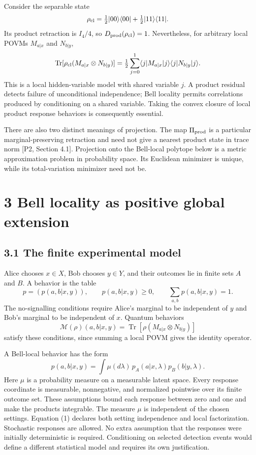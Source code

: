 \documentclass[
]{article}
\begin{document}
Consider the separable state
\[
\rho_{\rm cl}=\tfrac12|00\rangle\langle00|
                    +\tfrac12|11\rangle\langle11|.
\]
Its product retraction is \(I_4/4\), so \(D_{\rm prod}(\rho_{\rm cl})=1\). Nevertheless, for arbitrary local POVMs \(M_{a|x}\) and \(N_{b|y}\),
\[
\operatorname{Tr}[\rho_{\rm cl}(M_{a|x}\otimes N_{b|y})]
=\tfrac12\sum_{j=0}^1
\langle j|M_{a|x}|j\rangle\langle j|N_{b|y}|j\rangle.
\]
This is a local hidden-variable model with shared variable \(j\). A product residual detects failure of unconditional independence; Bell locality permits correlations produced by conditioning on a shared variable. Taking the convex closure of local product response behaviors is consequently essential.

There are also two distinct meanings of projection. The map \(\Pi_{\rm prod}\) is a particular marginal-preserving retraction and need not give a nearest product state in trace norm {[}P2, Section 4.1{]}. Projection onto the Bell-local polytope below is a metric approximation problem in probability space. Its Euclidean minimizer is unique, while its total-variation minimizer need not be.

\section{3 Bell locality as positive global extension}\label{bell-locality-as-positive-global-extension}

\subsection{3.1 The finite experimental model}\label{the-finite-experimental-model}

Alice chooses \(x\in X\), Bob chooses \(y\in Y\), and their outcomes lie in finite sets \(A\) and \(B\). A behavior is the table
\[
p=(p(a,b|x,y)),\qquad p(a,b|x,y)\ge0,\qquad
\sum_{a,b}p(a,b|x,y)=1.
\]
The no-signalling conditions require Alice's marginal to be independent of \(y\) and Bob's marginal to be independent of \(x\). Quantum behaviors
\[
\mathcal M(\rho)(a,b|x,y)
=\operatorname{Tr}[\rho(M_{a|x}\otimes N_{b|y})]
\]
satisfy these conditions, since summing a local POVM gives the identity operator.

A Bell-local behavior has the form
\[
p(a,b|x,y)=\int \mu(d\lambda)\,
p_A(a|x,\lambda)p_B(b|y,\lambda).
\tag{1}
\]
Here \(\mu\) is a probability measure on a measurable latent space. Every response coordinate is measurable, nonnegative, and normalized pointwise over its finite outcome set. These assumptions bound each response between zero and one and make the products integrable. The measure \(\mu\) is independent of the chosen settings. Equation (1) declares both setting independence and local factorization. Stochastic responses are allowed. No extra assumption that the responses were initially deterministic is required. Conditioning on selected detection events would define a different statistical model and requires its own justification.
\end{document}
